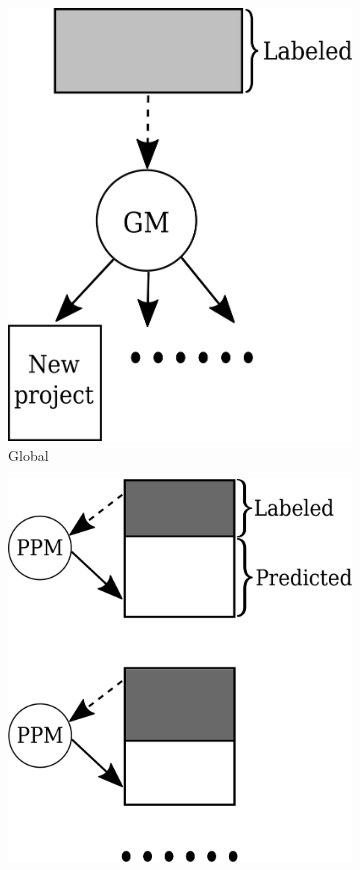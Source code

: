 \documentclass[12pt]{report}	%
\begin{document}
\begin{figure}[t]
\centering
\begin{subfigure}[b]{0.3\textwidth}
	\centering
    \includegraphics[width=.75\linewidth]{images/global-m.pdf}
    \caption{Global \paradigm}
     \label{fig:mmodels:global}
\end{subfigure}%
\hfill
\begin{subfigure}[b]{0.3\textwidth}
	\centering
    \includegraphics[width=.85\linewidth]{images/per-project.pdf}

\end{subfigure}
\end{figure}
\end{document}
